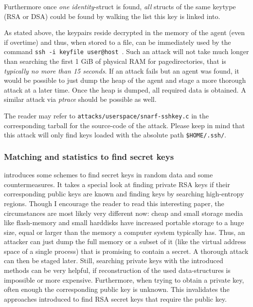 Furthermore once \emph{one} \emph{identity}-struct is found, \emph{all} structs
of the same keytype (RSA or DSA) could be found by walking the list this key is
linked into.

As stated above, the keypairs reside decrypted in the memory of the agent (even
if overtime) and thus, when stored to a file, can be immediately used by the
command \texttt{ssh~-i~keyfile~user@host}~.  Such an attack will not take much
longer than searching the first 1 GiB of physical RAM for pagedirectories, that
is \emph{typically no more than 15 seconds}. If an attack fails but an agent was
found, it would be possible to just dump the heap of the agent and stage a more
thorough attack at a later time. Once the heap is dumped, all required data is
obtained. A similar attack via \emph{ptrace} should be possible as well.

The reader may refer to \texttt{attacks/userspace/snarf-sshkey.c} in the
corresponding tarball for the source-code of the attack. Please keep in mind
that this attack will only find keys loaded with the absolute path
\texttt{\$HOME/.ssh/}.


\subsubsection{Matching and statistics to find secret keys}

\cite{hide_n_seek:1998} introduces some schemes to find secret keys in random
data and some countermeasures. It takes a special look at finding private RSA
keys if their corresponding public keys are known and finding keys by searching
high-entropy regions. Though I encourage the reader to read this interesting
paper, the circumstances are most likely very different now: cheap and small
storage media like flash-memory and small harddisks have increased portable
storage to a huge size, equal or larger than the memory a computer system
typically has. Thus, an attacker can just dump the full memory or a subset of it
(like the virtual address space of a single process) that is promising to
contain a secret. A thorough attack can then be staged later.  Still, searching
private keys with the introduced methods can be very helpful, if reconstruction
of the used data-structures is impossible or more expensive. Furthermore, when
trying to obtain a private key, often enough the corresponding public key is
unknown. This invalidates the approaches introduced to find RSA secret keys that
require the public key.




